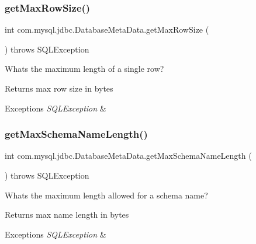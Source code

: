 \subsubsection{\texorpdfstring{get\+Max\+Row\+Size()}{getMaxRowSize()}}
{\footnotesize\ttfamily int com.\+mysql.\+jdbc.\+Database\+Meta\+Data.\+get\+Max\+Row\+Size (\begin{DoxyParamCaption}{ }\end{DoxyParamCaption}) throws S\+Q\+L\+Exception}

What\textquotesingle{}s the maximum length of a single row?

\begin{DoxyReturn}{Returns}
max row size in bytes 
\end{DoxyReturn}

\begin{DoxyExceptions}{Exceptions}
{\em S\+Q\+L\+Exception} & \\
\hline
\end{DoxyExceptions}
\mbox{\label{classcom_1_1mysql_1_1jdbc_1_1_database_meta_data_a8951254ec4bb2224e3fd64e776b08f98}} 
\subsubsection{\texorpdfstring{get\+Max\+Schema\+Name\+Length()}{getMaxSchemaNameLength()}}
{\footnotesize\ttfamily int com.\+mysql.\+jdbc.\+Database\+Meta\+Data.\+get\+Max\+Schema\+Name\+Length (\begin{DoxyParamCaption}{ }\end{DoxyParamCaption}) throws S\+Q\+L\+Exception}

What\textquotesingle{}s the maximum length allowed for a schema name?

\begin{DoxyReturn}{Returns}
max name length in bytes 
\end{DoxyReturn}

\begin{DoxyExceptions}{Exceptions}
{\em S\+Q\+L\+Exception} & \\
\hline
\end{DoxyExceptions}
\mbox{\label{classcom_1_1mysql_1_1jdbc_1_1_database_meta_data_adbb5d3550d47bc03aa478386483853ba}} 
